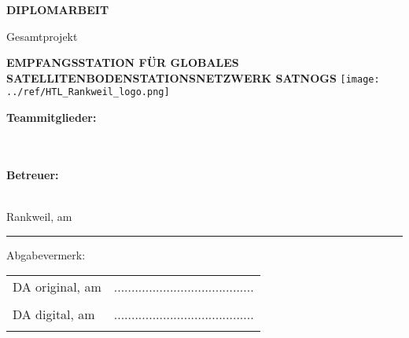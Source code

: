 \documentclass[hidelinks,12pt,a4paper,twoside]{report}
\begin{document}
	\begin{center}
		\textbf {\huge {\uppercase {Diplomarbeit}}}
		\par \large {Gesamtprojekt}
		\par \textbf {\huge {\uppercase {Empfangsstation für globales Satellitenbodenstationsnetzwerk SatNOGS}}}
		\vspace{0.3cm}
		\linebreak
		\texttt{[image: ../ref/HTL\_Rankweil\_logo.png]}
	\end{center}
	
	\vfill %
	
	
	\begin{minipage}[t] {0.4\textwidth}
		\textbf{Teammitglieder:} \\
		\emplLastA \\
		\emplLastB \\
	\end{minipage}
	\begin{minipage}[t] {0.4\textwidth}
		\textbf{Betreuer:} \\		
		\supervisor \\
	\end{minipage}
	
	\par Rankweil, am \PrintDate \\		
	
	\noindent\rule{\textwidth}{0.4pt}
	Abgabevermerk:
	\linebreak
	
	\begin{tabular}{p{7cm}C{6cm}}
		\hspace{1cm} DA original, am \PrintDate & ........................................ \\ 
		& \supervisor \\ [2.5em]
		
		\hspace{1cm} DA digital, am \PrintDate & ........................................ \\ 
		& \supervisor \\
	\end{tabular}
	
	
	\newpage
	
	\SecAuth{\emplLastA, \emplLastB} %
	
	\fancyfoot[LE,RO]{\thepage}
	\fancyfoot[LO,RE]{\DADate~\textbar~\diplomatitle~\textbar ~\@SecAuth}
	\renewcommand{\footrulewidth}{0.4pt} %
	
\end{document}

